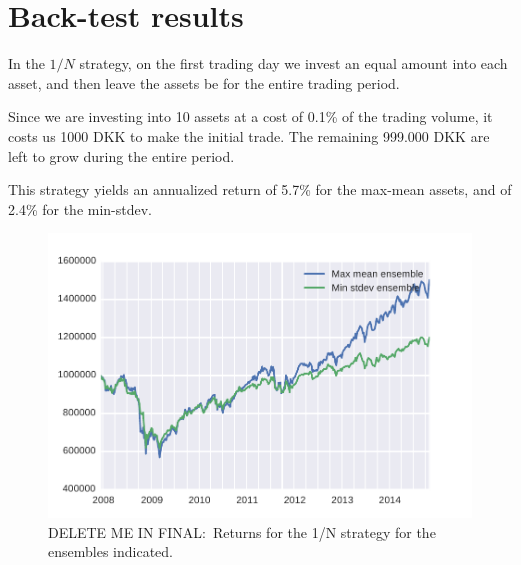 \section{Back-test results}

In the $1/N$ strategy, on the first trading day we invest  an equal amount into each asset, and then leave the assets be for the entire trading period.

Since we are investing into 10 assets at a cost of 0.1\% of the trading volume, it costs us 1000 DKK to make the initial trade.
The remaining 999.000 DKK are left to grow during the entire period.

This strategy yields an annualized return of 5.7\% for the max-mean assets, and of 2.4\% for the min-stdev.


\begin{figure}[tp]
\centering
\includegraphics{../pic/returns_1overN_only.pdf}
\caption{DELETE ME IN FINAL:\ Returns for the 1/N strategy for the ensembles indicated.}
\label{fig:bondsyield}
\end{figure}
